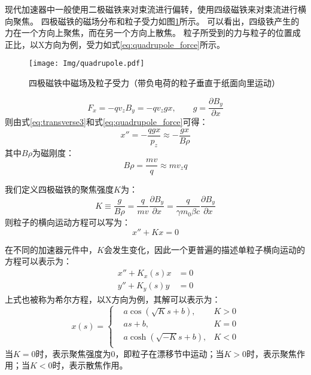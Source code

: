 现代加速器中一般使用二极磁铁来对束流进行偏转，使用四级磁铁来对束流进行横向聚焦。
四极磁铁的磁场分布和粒子受力如图\ref{fig:quadrupole}所示\cite{qinq2011ring}。
可以看出，四级铁产生的力在一个方向上聚焦，而在另一个方向上散焦。
粒子所受到的力与粒子的位置成正比，以X方向为例，受力如式\ref{eq:quadrupole_force}所示。
\begin{figure}[!htb]
    \centering
    \texttt{[image: Img/quadrupole.pdf]}
    \caption{四极磁铁中磁场及粒子受力（带负电荷的粒子垂直于纸面向里运动）}
    \label{fig:quadrupole}
\end{figure}
\begin{equation}
    \label{eq:quadrupole_force}
    F_x = -q {v}_{z} {B}_{y} = -q {v}_{z} g x, \qquad g=\frac{\partial B_y}{\partial x}
\end{equation}
则由式\ref{eq:transverse3}和式\ref{eq:quadrupole_force}可得：
\begin{equation}
    \label{eq:quadrupole_force2}
    x'' = -\frac{qgx}{p_z} \approx -\frac{gx}{B\rho}
\end{equation}
其中${B\rho}$为磁刚度：
\begin{equation}
    {B\rho}=\frac{mv}{q}\approx{mv_z}{q}
\end{equation}

我们定义四极磁铁的聚焦强度$K$为：
\begin{equation}
    \label{eq:quadrupole_force3}
    K \equiv \frac{g}{B\rho} = \frac{q}{mv}                 \frac{\partial B_y}{\partial x}
                             = \frac{q}{\gamma m_0 \beta c} \frac{\partial B_y}{\partial x}
\end{equation}
则粒子的横向运动方程可以写为：
\begin{equation}
    \label{eq:Mathier_Hill_x}
    x'' + Kx =0
\end{equation}

在不同的加速器元件中，$K$会发生变化，因此一个更普遍的描述单粒子横向运动的方程可以表示为：
\begin{equation}
    \label{eq:Mathier_Hill}
    \begin{aligned}
        x'' + K_x(s)x &= 0 \\
        y'' + K_y(s)y &= 0
    \end{aligned}
\end{equation}
上式也被称为希尔方程，以X方向为例，其解可以表示为\cite{abramowitz1964handbook}：
\begin{equation}
    \label{eq:Mathier_Hill_solver}
    x(s)=\left\{
    \begin{aligned}
        &a\cos (\sqrt{K}s+b) ,& K>0 \\
        &as+b                ,& K=0 \\
        &a\cosh(\sqrt{-K}s+b),& K<0 \\
    \end{aligned}
    \right.
\end{equation}
当$K=0$时，表示聚焦强度为0，即粒子在漂移节中运动；当$K>0$时，表示聚焦作用；当$K<0$时，表示散焦作用。

